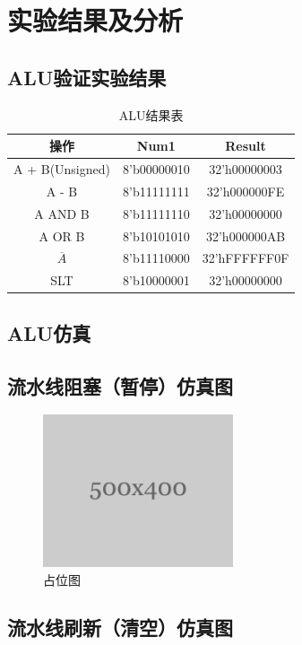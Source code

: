 \section{实验结果及分析}
\subsection{ALU验证实验结果}
\begin{table}[htbp]
    \centering
    \begin{tabular}{c|c|c}
        操作            &	Num1        &	Result\\
        \hline
        A + B(Unsigned) &	8'b00000010 &32'h00000003 	\\
        A - B           &	8'b11111111 &32'h000000FE	\\
        A AND B         &	8'b11111110 &32'h00000000	\\
        A OR B          &	8'b10101010 &32'h000000AB	\\
        $\overline{A}$  &	8'b11110000 &32'hFFFFFF0F	\\
        SLT             &	8'b10000001 &32'h00000000	\\
        \hline
    \end{tabular}
    \caption{ALU结果表}
    \label{tab:my_label}
\end{table}
\subsection{ALU仿真}
\subsection{流水线阻塞（暂停）仿真图}
\begin{figure}[htbp]
    \centering
    \includegraphics[width=0.5\textwidth]{image/place_holder.png}
    \caption{占位图}
    \label{fig:my_label}
\end{figure}
\subsection{流水线刷新（清空）仿真图}